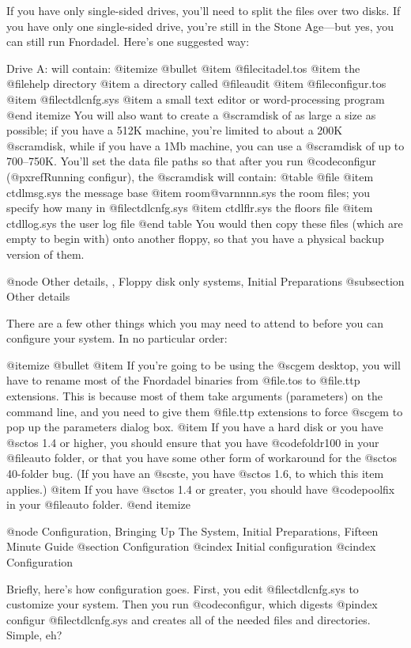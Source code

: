 If you have only single-sided drives,
you'll need to split the files over two disks.  If you have only one
single-sided drive, you're still in the Stone Age---but yes, you can still
run Fnordadel.  Here's one suggested way:

Drive A: will contain:
@itemize @bullet
@item
@file{citadel.tos}
@item
the @file{help} directory
@item
a directory called @file{audit}
@item
@file{configur.tos}
@item
@file{ctdlcnfg.sys}
@item
a small text editor or word-processing program
@end itemize
You will also want to create a @sc{ram}disk of as large a size as possible; if you
have a 512K machine, you're limited to about a 200K @sc{ram}disk, while if you have
a 1Mb machine, you can use a @sc{ram}disk of up to 700--750K.
You'll set the data file paths so that after you run @code{configur}
(@pxref{Running configur}), the @sc{ram}disk will
contain:
@table @file
@item ctdlmsg.sys
the message base
@item room@var{nnnn}.sys
the room files; you specify how many in @file{ctdlcnfg.sys}
@item ctdlflr.sys
the floors file
@item ctdllog.sys
the user log file
@end table
You would then copy these files (which are empty to begin with) onto another
floppy, so that you have a physical backup version of them.

@node Other details,  , Floppy disk only systems, Initial Preparations
@subsection Other details

There are a few other things which you may need to attend to before you can
configure your system.  In no particular order:

@itemize @bullet
@item
If you're going to be using the @sc{gem} desktop, you will have to rename
most of the Fnordadel binaries from @file{.tos} to @file{.ttp} extensions.
This is because most of them take arguments (parameters) on the command line,
and you need to give them @file{.ttp} extensions to force @sc{gem} to pop
up the parameters dialog box.
@item
If you have a hard disk or you have @sc{tos} 1.4 or higher,
you should ensure that you have @code{foldr100} in
your @file{auto} folder, or that you have some other form of workaround for
the @sc{tos} 40-folder bug.  (If you have an @sc{ste}, you have @sc{tos} 1.6,
to which this item applies.)
@item
If you have @sc{tos} 1.4 or greater, you should have @code{poolfix} in your
@file{auto} folder.
@end itemize

@node Configuration, Bringing Up The System, Initial Preparations, Fifteen Minute Guide
@section Configuration
@cindex Initial configuration
@cindex Configuration

Briefly, here's how configuration goes.  First, you edit @file{ctdlcnfg.sys}
to customize your system.  Then you run @code{configur}, which digests
@pindex configur
@file{ctdlcnfg.sys} and creates all of the needed files and directories.
Simple, eh?

